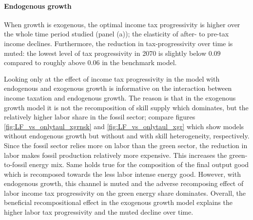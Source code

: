 \paragraph{Endogenous growth}
When growth is exogenous, the optimal income tax progressivity is higher over the whole time period studied (panel (a)); the elasticity of after- to pre-tax income declines. Furthermore, the reduction in tax-progressivity over time is muted: the lowest level of tax progressivity in 2070 is slightly below $0.09$ compared to roughly above $0.06$ in the benchmark model. 


Looking only at the effect of income tax progressivity in the model with endogenous and exogenous growth is informative on the interaction between income taxation and endogenous growth. 
The reason is that in the exogenous growth model it is not the recomposition of skill supply which dominates, but the relatively higher labor share in the fossil sector; compare figures \ref{fig:LF_vs_onlytaul_xgrnsk} and \ref{fig:LF_vs_onlytaul_xgr} which show models without endogenous growth but without and with skill heterogeneity, respectively. Since the fossil sector relies more on labor than the green sector, the reduction in labor makes fossil production relatively more expensive. This increases the green-to-fossil energy mix. Same holds true for the composition of the final output good which is recomposed towards the less labor intense energy good. However, with endogenous growth, this channel is muted and the adverse recomposing effect of labor income tax progressivity on the green energy share dominates. Overall, the beneficial recompositional effect in the exogenous growth model explains the higher labor tax progressivity and the muted decline over time. 

